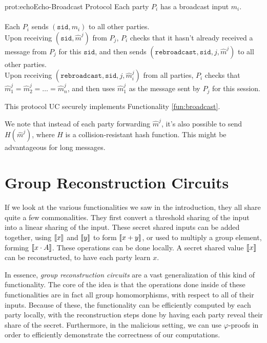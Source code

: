 \begin{aprotocol}{prot:echo}{Echo-Broadcast Protocol}
Each party $P_i$ has a broadcast input $m_i$.\\
\\
Each $P_i$ sends $(\texttt{sid}, m_i)$ to all other parties.\\
Upon receiving $(\texttt{sid}, \hat{m}^j)$ from $P_j$, $P_i$ checks that
it hasn't already received a message from $P_j$ for this $\texttt{sid}$,
and then sends $(\texttt{rebroadcast}, \texttt{sid}, j, \hat{m}^j)$ to all other parties.\\
Upon receiving $(\texttt{rebroadcast}, \texttt{sid}, j, \hat{m}_i^j)$ from all
parties, $P_i$ checks that $\hat{m}_1^j = \hat{m}_2^j = \ldots = \hat{m}^j_n$,
and then uses $\hat{m}^j_1$ as the message sent by $P_j$ for this session.
\end{aprotocol}

This protocol UC securely implements Functionality \ref{fun:broadcast}.

We note that instead of each party forwarding $\hat{m}^j$, it's also possible
to send $H(\hat{m}^j)$, where $H$ is a collision-resistant hash function.
This might be advantageous for long messages.

\section{Group Reconstruction Circuits}

If we look at the various functionalities we saw in the introduction,
they all share quite a few commonalities. They first convert
a threshold sharing of the input into a linear sharing of the input.
These secret shared inputs can be added together, using $\llbracket x\rrbracket$ and $\llbracket y\rrbracket$
to form $\llbracket x + y\rrbracket$, or used to multiply a group element, forming
$\llbracket x \cdot A\rrbracket$. These operations can be done locally.
A secret shared value $\llbracket x\rrbracket$ can be reconstructed, to have each party learn $x$.

In essence, \emph{group reconstruction circuits} are a vast generalization
of this kind of functionality. The core of the idea is that the operations
done inside of these functionalities are in fact all group homomorphisms,
with respect to all of their inputs. Because of these, the functionality
can be efficiently computed by each party locally, with the reconstruction
steps done by having each party reveal their share of the secret.
Furthermore, in the malicious setting, we can use $\varphi$-proofs in
order to efficiently demonstrate the correctness of our computations.

